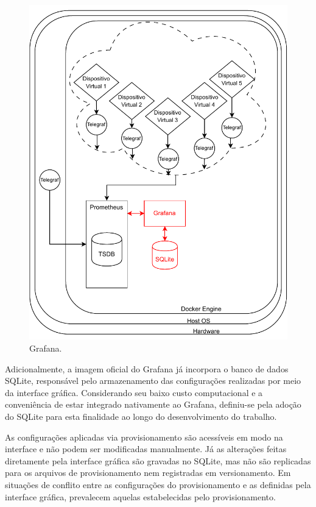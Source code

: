\begin{figure}[H]
\centering
\includegraphics[scale=1]{Imagens/chap03/by-blocks/grafana_diagram.pdf}
\caption{Grafana.}
\label{fig:DiagramaGrafana}
\end{figure}

Adicionalmente, a imagem oficial do Grafana já incorpora o banco de dados SQLite, responsável pelo armazenamento das configurações realizadas por meio da interface gráfica. Considerando seu baixo custo computacional e a conveniência de estar integrado nativamente ao Grafana, definiu-se pela adoção do SQLite para esta finalidade ao longo do desenvolvimento do trabalho.

As configurações aplicadas via provisionamento são acessíveis em modo  na interface e não podem ser modificadas manualmente. Já as alterações feitas diretamente pela interface gráfica são gravadas no SQLite, mas não são replicadas para os arquivos de provisionamento nem registradas em versionamento. Em situações de conflito entre as configurações do provisionamento e as definidas pela interface gráfica, prevalecem aquelas estabelecidas pelo provisionamento.

